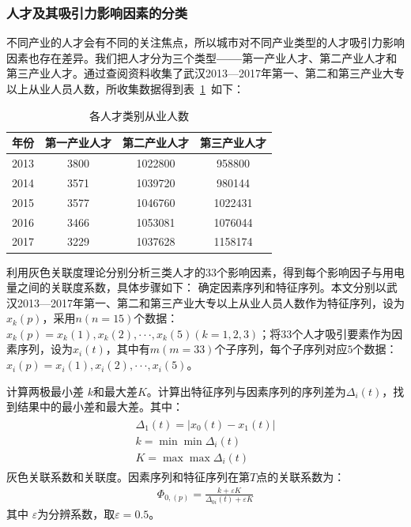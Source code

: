 \documentclass{whutmod}
\begin{document}
	\subsubsection{人才及其吸引力影响因素的分类}
	不同产业的人才会有不同的关注焦点，所以城市对不同产业类型的人才吸引力影响因素也存在差异。我们把人才分为三个类型\textbf{——}第一产业人才、第二产业人才和第三产业人才。通过查阅资料\cite{武汉统计局}收集了武汉2013—2017年第一、第二和第三产业大专以上从业人员人数，所收集数据得到表~\ref{hhh}~如下：
	\begin{table}[H]
		\centering
		\caption{各人才类别从业人数}\label{hhh}
		\begin{tabular}{cccc}
			\toprule[2pt]
			\multicolumn{1}{m{2cm}}{\centering 年份}&
			\multicolumn{1}{m{3cm}}{\centering 第一产业人才} & \multicolumn{1}{m{3cm}}{\centering 第二产业人才} & \multicolumn{1}{m{3cm}}{\centering 第三产业人才}\\
			\midrule[1pt]
			2013	 &  3800 & 1022800&958800\\ 
			2014 & 3571 & 1039720&980144\\ 
			2015	 &  3577&1046760&1022431\\ 
			2016  &  3466& 1053081&1076044\\ 
			2017  & 3229& 1037628&1158174\\
			\bottomrule[2pt]
		\end{tabular}
	\end{table}

	利用灰色关联度理论分别分析三类人才的$33$个影响因素，得到每个影响因子与用电量之间的关联度系数，具体步骤如下：
	确定因素序列和特征序列。本文分别以武汉2013—2017年第一、第二和第三产业大专以上从业人员人数作为特征序列，设为$x_{k}(p)$，采用$n(n=15)$个数据：$x_{k}(p)={x_{k}(1),x_{k}(2),···,x_{k}(5)}(k=1,2,3)$；将$33$个人才吸引要素作为因素序列，设为$x_{i}(t)$，其中有$m(m=33)$个子序列，每个子序列对应$5$个数据：$x_{i}(p)={x_{i}(1),x_{i}(2),···,x_{i}(5)}$。
	
	计算两极最小差 $k$和最大差$K$。计算出特征序列与因素序列的序列差为$\Delta _{i}(t)$，找到结果中的最小差和最大差。其中：
	\begin{gather}
	\begin{array} { l } { \Delta _ { 1 } ( t ) = \left| x _ { 0 } ( t ) - x _ { 1 } ( t ) \right| } \\ { k = \min \min \Delta _ { i } ( t ) } \\ { K = \max \max \Delta _ { i } ( t ) } \end{array}
	\end{gather}
	灰色关联系数和关联度。因素序列和特征序列在第$T$点的关联系数为：
	\begin{gather}
	\Phi _ { 0 , ( p ) } = \frac { k + \varepsilon K } { \Delta _ { 0 i } ( t ) + \varepsilon K }
	\end{gather}
	其中 $\varepsilon$为分辨系数，取$\varepsilon=0.5$。
\end{document}
